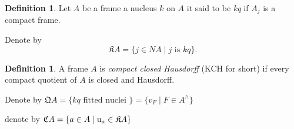 \documentclass[11pt]{amsart}
\theoremstyle{plain}
\theoremstyle{definition}
\newtheorem{dfn}[thm]{Definition}
\begin{document}
\begin{dfn}\label{KQ}
Let $A$ be a frame a nucleus $k$ on $A$ it said to be \emph{kq} if $A_{j}$ is a compact frame. 
\end{dfn}
Denote by 
\[
\mathfrak{K}A=\{j\in NA\mid j \text{ is } kq\}.
\]

\begin{dfn}\label{KCH}
A frame $A$ is \emph{compact closed Hausdorff} ({\rm KCH} for short) if every compact quotient of $A$ is closed and Hausdorff.
\end{dfn}



Denote by $\mathfrak{Q}A=\{kq\text{ fitted nuclei }\}=\{v_{F}\mid F\in A^{\wedge}\}$




denote by $\mathfrak{C}A=\{a\in A\mid {\rm u}_{a}\in\mathfrak{K}A\}$





\cite{escardo2001regular} \cite{escardo2006compactly}


\cite{sexton2006point}





\end{document}
